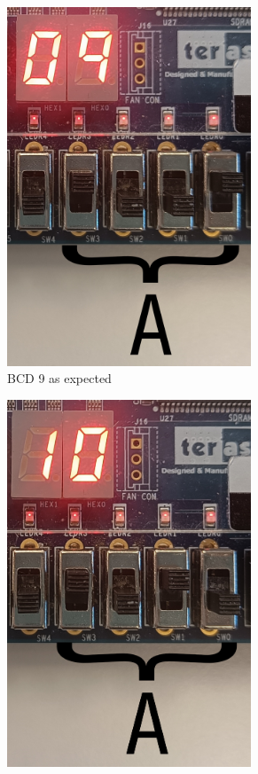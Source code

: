 \documentclass{article}
\begin{document}
\begin{figure}[h]
\begin{subfigure}{0.4\textwidth}
        \includegraphics[width=0.8\textwidth]{Figures/Part2-9.jpg}
        \caption{BCD 9 as expected}
        \label{fig:T02pic2}
    \end{subfigure}
    \begin{subfigure}{0.4\textwidth}
        \centering
        \includegraphics[width=0.8\textwidth]{Figures/Part2-10.jpg}

\end{subfigure}
\end{figure}
\end{document}
